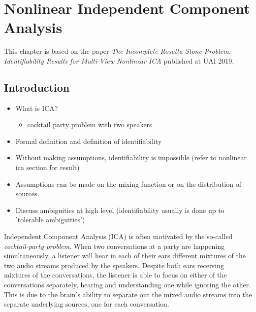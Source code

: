 \chapter{Nonlinear Independent Component Analysis}

\ifpdf
    \graphicspath{{Chapter4/Figs/Raster/}{Chapter4/Figs/PDF/}{Chapter4/Figs/}}
\else
    \graphicspath{{Chapter4/Figs/Vector/}{Chapter4/Figs/}}
\fi

This chapter is based on the paper \emph{The Incomplete Rosetta Stone Problem: Identifiability Results for Multi-View Nonlinear ICA} published at UAI 2019.


\section{Introduction}

\begin{itemize}
	\item What is ICA?
	\begin{itemize}
		\item cocktail party problem with two speakers
	\end{itemize}
	\item Formal definition and definition of identifiability
	\item Without making assumptions, identifiability is impossible (refer to nonlinear ica section for result)
	\item Assumptions can be made on the mixing function or on the distribution of sources.
	\item Discuss ambiguities at high level (identifiability usually is done up to 'tolerable ambiguities')
\end{itemize}

Independent Component Analysis (ICA) is often motivated by the so-called \emph{cocktail-party problem}.
When two conversations at a party are happening simultaneously, a listener will hear in each of their ears different mixtures of the two audio streams produced by the speakers.
Despite both ears receiving mixtures of the conversations, the listener is able to focus on either of the conversations separately, hearing and understanding one while ignoring the other.
This is due to the brain's ability to separate out the mixed audio streams into the separate underlying sources, one for each conversation.

